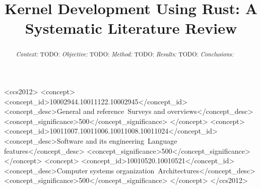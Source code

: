 \documentclass[sigconf]{acmart}
\begin{document}
\title{Kernel Development Using Rust: A Systematic Literature Review}



\renewcommand{\shortauthors}{Panter et al.}

\begin{abstract}
    \textit{Context:}
    TODO:
    \textit{Objective:}
    TODO:
    \textit{Method:}
    TODO:
    \textit{Results:}
    TODO:
    \textit{Conclusions:}
\end{abstract}


\begin{CCSXML}
<ccs2012>
<concept>
<concept_id>10002944.10011122.10002945</concept_id>
<concept_desc>General and reference~Surveys and overviews</concept_desc>
<concept_significance>500</concept_significance>
</concept>
<concept>
<concept_id>10011007.10011006.10011008.10011024</concept_id>
<concept_desc>Software and its engineering~Language features</concept_desc>
<concept_significance>500</concept_significance>
</concept>
<concept>
<concept_id>10010520.10010521</concept_id>
<concept_desc>Computer systems organization~Architectures</concept_desc>
<concept_significance>500</concept_significance>
</concept>
</ccs2012>
\end{CCSXML}






\maketitle
\end{document}
